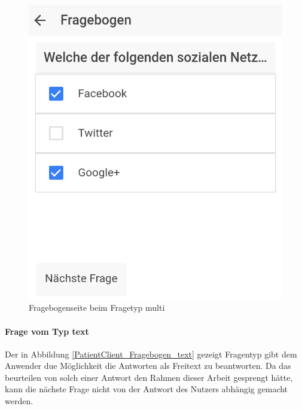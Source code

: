 \begin{figure}[H]
	\centering
	\includegraphics[scale=0.3]{images/Screenshots/PatientClient/Fragebogen_multi}
	\caption[Fragebogenseite beim Fragetyp multi]{Fragebogenseite beim Fragetyp multi}
	\label{PatientClient_Fragebogen_multi}
\end{figure}
\paragraph{Frage vom Typ text}
Der in Abbildung \ref{PatientClient_Fragebogen_text} gezeigt Fragentyp gibt dem Anwender due Möglichkeit die Antworten als Freitext zu beantworten. Da das beurteilen von solch einer Antwort den Rahmen dieser Arbeit gesprengt hätte, kann die nächste Frage nicht von der Antwort des Nutzers abhängig gemacht werden.

